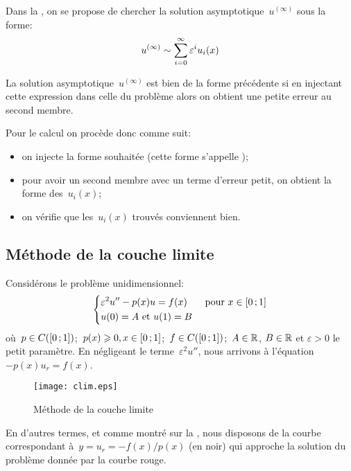 Dans la , on se propose de chercher la solution asymptotique~$u^{(\infty)}$ sous la forme:
\begin{equation}
u^{(\infty)} \sim \displaystyle\sum_{i=0}^\infty \varepsilon^iu_i(x)
\end{equation}

\medskip
La solution asymptotique~$u^{(\infty)}$ est bien de la forme précédente si en injectant cette expression dans celle du problème alors on obtient une petite erreur au second membre.

\medskip
Pour le calcul on procède donc comme suit:
\begin{itemize}
  \item on injecte la forme souhaitée (cette forme s'appelle );
  \item pour avoir un second membre avec un terme d'erreur petit, on obtient la forme des~$u_i(x)$;
  \item on vérifie que les~$u_i(x)$ trouvés conviennent bien.
\end{itemize}


\medskip
\subsection{Méthode de la couche limite}

Considérons le problème unidimensionnel:
\begin{equation}
\left\{
\begin{aligned}
&\varepsilon^2u''-p(x)u= f(x) &&\text{ pour } x\in\mathopen{[}0\,;1\mathclose{]}\\
&u(0)=A \text{ et } u(1)=B
\end{aligned}
\right.
\end{equation}
où~$p\in C(\mathopen{[}0\,;1\mathclose{]})$;~$p(x)\geqslant0, x\in\mathopen{[}0\,;1\mathclose{]}$;~$f\in C(\mathopen{[}0\,;1\mathclose{]})$;~$A\in\mathbb R$, $B\in\mathbb R$ et
$\varepsilon>0$ le petit paramètre.
En négligeant le terme~$\varepsilon^2 u''$, nous arrivons à l'équation~$-p(x)u_r=f(x)$.
\begin{figure}[ht]
\centering\texttt{[image: clim.eps]}
\caption{Méthode de la couche limite}\label{Fig-clim}
\end{figure}
En d'autres termes, et comme montré sur la , nous disposons de la courbe correspondant à~$y=u_r=-f(x)/p(x)$ (en noir) qui approche la solution du problème donnée par la courbe rouge.


